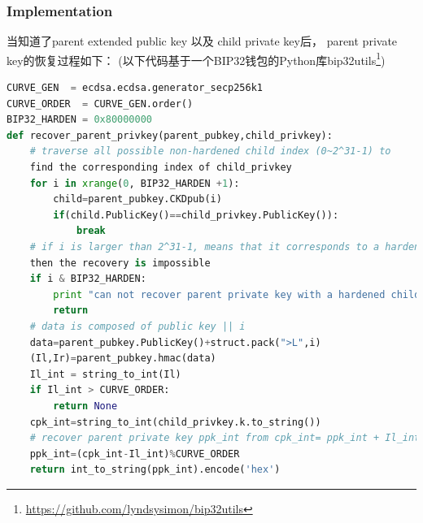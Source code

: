 \subsubsection{Implementation}
当知道了parent extended public key 以及 child private key后，
parent private key的恢复过程如下：
(以下代码基于一个BIP32钱包的Python库bip32utils\footnote{\url{https://github.com/lyndsysimon/bip32utils}})

\begin{lstlisting}[language=python,label=lst-recover]
CURVE_GEN  = ecdsa.ecdsa.generator_secp256k1
CURVE_ORDER  = CURVE_GEN.order()
BIP32_HARDEN = 0x80000000 
def recover_parent_privkey(parent_pubkey,child_privkey):
	# traverse all possible non-hardened child index (0~2^31-1) to 
	find the corresponding index of child_privkey
	for i in xrange(0, BIP32_HARDEN +1):
		child=parent_pubkey.CKDpub(i)
		if(child.PublicKey()==child_privkey.PublicKey()):
			break
    # if i is larger than 2^31-1, means that it corresponds to a hardened child, 
    then the recovery is impossible
	if i & BIP32_HARDEN:
		print "can not recover parent private key with a hardened child node"
		return
	# data is composed of public key || i
	data=parent_pubkey.PublicKey()+struct.pack(">L",i)
	(Il,Ir)=parent_pubkey.hmac(data)
	Il_int = string_to_int(Il)
	if Il_int > CURVE_ORDER:
	    return None
	cpk_int=string_to_int(child_privkey.k.to_string())
	# recover parent private key ppk_int from cpk_int= ppk_int + Il_int mod n
	ppk_int=(cpk_int-Il_int)%CURVE_ORDER
	return int_to_string(ppk_int).encode('hex')
\end{lstlisting}


